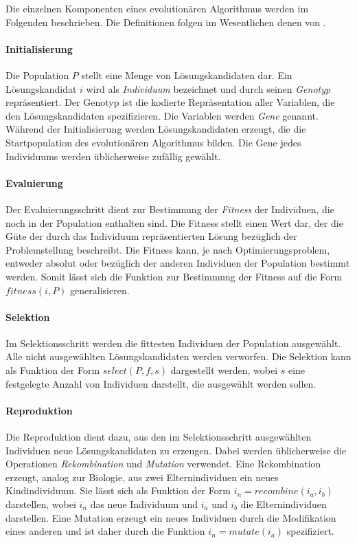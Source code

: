 Die einzelnen Komponenten eines evolutionären Algorithmus werden im Folgenden beschrieben. Die Definitionen folgen im Wesentlichen denen von \textcite{tw2008}.

\paragraph{Initialisierung}

Die Population \(P\) stellt eine Menge von Lösungskandidaten dar. Ein Lösungskandidat \(i\) wird als \emph{Individuum} bezeichnet und durch seinen \emph{Genotyp} repräsentiert. Der Genotyp ist die kodierte Repräsentation aller Variablen, die den Lösungskandidaten spezifizieren. Die Variablen werden \emph{Gene} genannt. Während der Initialisierung werden Lösungskandidaten erzeugt, die die Startpopulation des evolutionären Algorithmus bilden. Die Gene jedes Individuums werden üblicherweise zufällig gewählt.

\paragraph{Evaluierung}

Der Evaluierungsschritt dient zur Bestimmung der \emph{Fitness} der Individuen, die noch in der Population enthalten sind. Die Fitness stellt einen Wert dar, der die Güte der durch das Individuum repräsentierten Lösung bezüglich der Problemstellung beschreibt. Die Fitness kann, je nach Optimierungsproblem, entweder absolut oder bezüglich der anderen Individuen der Population bestimmt werden. Somit lässt sich die Funktion zur Bestimmung der Fitness auf die Form \(fitness(i, P)\) generalisieren.

\paragraph{Selektion}

Im Selektionsschritt werden die fittesten Individuen der Population ausgewählt. Alle nicht ausgewählten Lösungskandidaten werden verworfen. Die Selektion kann als Funktion der Form \(select(P, f, s)\) dargestellt werden, wobei \(s\) eine festgelegte Anzahl von Individuen darstellt, die ausgewählt werden sollen.

\paragraph{Reproduktion}

Die Reproduktion dient dazu, aus den im Selektionsschritt ausgewählten Individuen neue Lösungskandidaten zu erzeugen. Dabei werden üblicherweise die Operationen \emph{Rekombination} und \emph{Mutation} verwendet. Eine Rekombination erzeugt, analog zur Biologie, aus zwei Elternindividuen ein neues Kindindividuum. Sie lässt sich als Funktion der Form \(i_n = recombine(i_a, i_b)\) darstellen, wobei \(i_n\) das neue Individuum und \(i_a\) und \(i_b\) die Elternindividuen darstellen. Eine Mutation erzeugt ein neues Individuen durch die Modifikation eines anderen und ist daher durch die Funktion \(i_n = mutate(i_a)\) spezifiziert.

